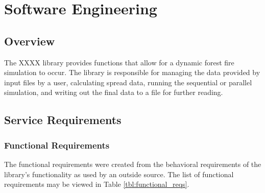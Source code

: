 \chapter{Software Engineering}
\label{chapter:design}

\section{Overview}
The XXXX library provides functions that allow for a dynamic forest fire simulation to occur. The library is responsible for managing the data provided by input files by a user, calculating spread data, running the sequential or parallel simulation, and writing out the final data to a file for further reading. 

\section{Service Requirements}

\subsection{Functional Requirements}
The functional requirements were created from the behavioral requirements of the library's functionality as used by an outside source. The list of functional requirements may be viewed in Table \ref{tbl:functional_reqs}.


